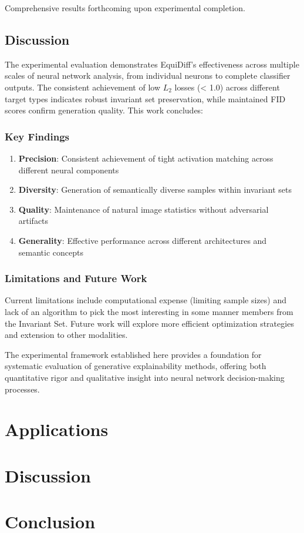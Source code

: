 \documentclass[licencjacka,en]{pracamgr}
\newcommand{\method}[1]{EquiDiff}  %
\begin{document}
Comprehensive results forthcoming upon experimental completion.

\section{Discussion}

The experimental evaluation demonstrates \method{}'s effectiveness across multiple scales of neural network analysis, from individual neurons to complete classifier outputs. The consistent achievement of low $L_2$ losses (< 1.0) across different target types indicates robust invariant set preservation, while maintained FID scores confirm generation quality. This work concludes:

\subsection{Key Findings}

\begin{enumerate}
\item \textbf{Precision}: Consistent achievement of tight activation matching across different neural components
\item \textbf{Diversity}: Generation of semantically diverse samples within invariant sets
\item \textbf{Quality}: Maintenance of natural image statistics without adversarial artifacts
\item \textbf{Generality}: Effective performance across different architectures and semantic concepts
\end{enumerate}

\subsection{Limitations and Future Work}

Current limitations include computational expense (limiting sample sizes) and lack of an algorithm to pick the most interesting in some manner members from the Invariant Set. Future work will explore more efficient optimization strategies and extension to other modalities.

The experimental framework established here provides a foundation for systematic evaluation of generative explainability methods, offering both quantitative rigor and qualitative insight into neural network decision-making processes.


\chapter{Applications}\label{r:applications}

\chapter{Discussion}\label{r:discussion}

\chapter{Conclusion}\label{r:conclusion}




\end{document}
